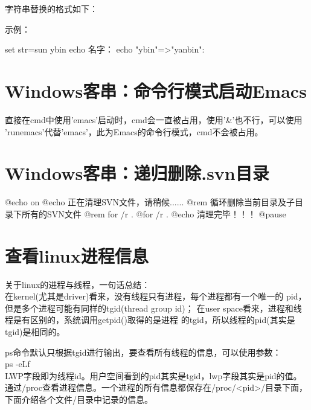 \documentclass[a4paper,11pt]{article}
\begin{document}
  字符串替换的格式如下：

  \begin{bashcode}
  \end{bashcode}

  示例：

  \begin{bashcode}
    set str=sun ybin
    echo 名字：%
    echo "ybin"=>"yanbin": %
  \end{bashcode}

  \section[Windows客串：命令行模式启动Emacs]{Windows客串：命令行模式启动Emacs}
  直接在cmd中使用'emacs'启动时，cmd会一直被占用，使用'\&'也不行，可以使用
  'runemacs'代替'emacs'，此为Emacs的命令行模式，cmd不会被占用。

  \section[Windows客串：递归删除.svn目录]{Windows客串：递归删除.svn目录}
  \begin{bashcode}
    @echo on
    @echo 正在清理SVN文件，请稍候......
    @rem 循环删除当前目录及子目录下所有的SVN文件
    @rem for /r . %
    @for /r . %
    @echo 清理完毕！！！
    @pause
  \end{bashcode}


  \section[查看linux进程信息]{查看linux进程信息}
  关于linux的进程与线程，一句话总结：\\
  在kernel(尤其是driver)看来，没有线程只有进程，每个进程都有一个唯一的
  pid，但是多个进程可能有同样的tgid(thread group id)；
  在user space看来，进程和线程是有区别的，系统调用getpid()取得的是进程
  的tgid，所以线程的pid(其实是tgid)是相同的。

  ps命令默认只根据tgid进行输出，要查看所有线程的信息，可以使用参数：\\
  ps -eLf\\
  LWP字段即为线程id。用户空间看到的pid其实是tgid，lwp字段其实是pid的值。\\[10pt]

  通过/proc查看进程信息。一个进程的所有信息都保存在/proc/<pid>/目录下面，
  下面介绍各个文件/目录中记录的信息。
\end{document}
